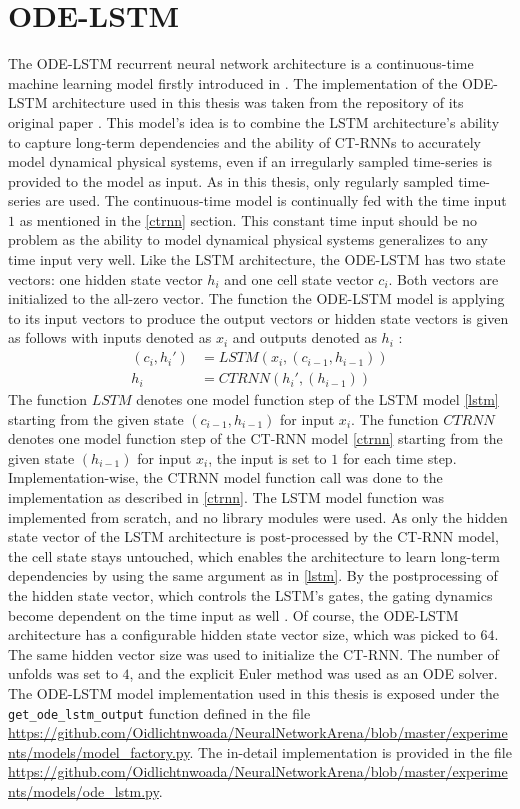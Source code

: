\documentclass[draft,final]{vutinfth} %
\begin{document}
\section{ODE-LSTM} \label{odelstm}
The ODE-LSTM recurrent neural network architecture is a continuous-time machine learning model firstly introduced in \cite{ODELSTM}.
The implementation of the ODE-LSTM architecture used in this thesis was taken from the repository of its original paper \cite{ODELSTM}.
This model's idea is to combine the LSTM architecture's ability to capture long-term dependencies and the ability of CT-RNNs to accurately model dynamical physical systems, even if an irregularly sampled time-series is provided to the model as input.
As in this thesis, only regularly sampled time-series are used. The continuous-time model is continually fed with the time input $1$ as mentioned in the \ref{ctrnn} section.
This constant time input should be no problem as the ability to model dynamical physical systems generalizes to any time input very well.
Like the LSTM architecture, the ODE-LSTM has two state vectors: one hidden state vector $h_i$ and one cell state vector $c_i$. Both vectors are initialized to the all-zero vector.
The function the ODE-LSTM model is applying to its input vectors to produce the output vectors or hidden state vectors is given as follows with inputs denoted as $x_i$ and outputs denoted as $h_i$ \cite[p. 5]{ODELSTM}:
\begin{align}
(c_i,h_i')
&= LSTM(x_i, (c_{i-1}, h_{i-1})) \\
h_i &= CTRNN(h_i', (h_{i-1}))
\end{align}
The function $LSTM$ denotes one model function step of the LSTM model \ref{lstm} starting from the given state $(c_{i-1}, h_{i-1})$ for input $x_i$.
The function $CTRNN$ denotes one model function step of the CT-RNN model \ref{ctrnn} starting from the given state $(h_{i-1})$ for input $x_i$, the input is set to $1$ for each time step.
Implementation-wise, the CTRNN model function call was done to the implementation as described in \ref{ctrnn}.
The LSTM model function was implemented from scratch, and no library modules were used.
As only the hidden state vector of the LSTM architecture is post-processed by the CT-RNN model, the cell state stays untouched, which enables the architecture to learn long-term dependencies by using the same argument as in \ref{lstm}.
By the postprocessing of the hidden state vector, which controls the LSTM's gates, the gating dynamics become dependent on the time input as well \cite[p. 4]{ODELSTM}.
Of course, the ODE-LSTM architecture has a configurable hidden state vector size, which was picked to $64$.
The same hidden vector size was used to initialize the CT-RNN. The number of unfolds was set to $4$, and the explicit Euler method was used as an ODE solver.
The ODE-LSTM model implementation used in this thesis is exposed under the \texttt{get\_ode\_lstm\_output} function defined in the file \url{https://github.com/Oidlichtnwoada/NeuralNetworkArena/blob/master/experiments/models/model_factory.py}.
The in-detail implementation is provided in the file \url{https://github.com/Oidlichtnwoada/NeuralNetworkArena/blob/master/experiments/models/ode_lstm.py}.
\end{document}
